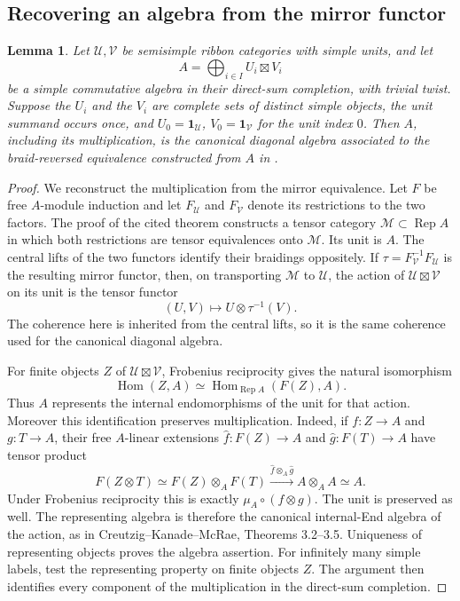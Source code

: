 \documentclass[11pt,a4paper]{article}
\numberwithin{equation}{section}
\newtheorem{lemma}[theorem]{Lemma}
\theoremstyle{definition}\newtheorem{definition}[theorem]{Definition}
\theoremstyle{remark}\newtheorem{remark}[theorem]{Remark}
\begin{document}
\subsection{Recovering an algebra from the mirror functor}

\begin{lemma}\label{c:mirror-recovers-algebra}
Let $\mathcal U,\mathcal V$ be semisimple ribbon categories with simple units,
and let
\[
 A=\bigoplus_{i\in I}U_i\boxtimes V_i
\]
be a simple commutative algebra in their direct-sum completion, with trivial
twist.  Suppose the $U_i$ and the $V_i$ are complete sets of distinct simple
objects, the unit summand occurs once, and $U_0=\mathbf1_{\mathcal U}$, $V_0=\mathbf1_{\mathcal V}$ for the unit index $0$.  Then $A$, including its multiplication, is the canonical diagonal
algebra associated to the braid-reversed equivalence constructed from $A$
in \cite[Proposition 4.4 and Theorem 4.5]{gluing}.
\end{lemma}
\begin{proof}
We reconstruct the multiplication from the mirror equivalence.  Let $F$ be free
$A$-module induction and let $F_{\mathcal U}$ and $F_{\mathcal V}$ denote its
restrictions to the two factors.  The proof of the cited theorem constructs
a tensor category $\mathcal M\subset\operatorname{Rep}A$ in which both
restrictions are tensor equivalences onto $\mathcal M$.  Its unit is $A$.
The central lifts of the two functors identify their braidings oppositely.
If $\tau=F_{\mathcal V}^{-1}F_{\mathcal U}$ is the resulting mirror functor,
then, on transporting $\mathcal M$ to $\mathcal U$, the action of
$\mathcal U\boxtimes\mathcal V$ on its unit is the tensor functor
\[
 (U,V)\longmapsto U\otimes\tau^{-1}(V).
\]
The coherence here is inherited from the central lifts, so it is the same
coherence used for the canonical diagonal algebra.

For finite objects $Z$ of $\mathcal U\boxtimes\mathcal V$, Frobenius
reciprocity gives the natural isomorphism
\[
 \operatorname{Hom}(Z,A)
   \simeq\operatorname{Hom}_{\operatorname{Rep}A}(F(Z),A).
\]
Thus $A$ represents the internal endomorphisms of the unit for that action.
Moreover this identification preserves multiplication.  Indeed, if
$f:Z\to A$ and $g:T\to A$, their free $A$-linear extensions
$\widehat f:F(Z)\to A$ and $\widehat g:F(T)\to A$ have tensor product
\[
 F(Z\otimes T)\simeq F(Z)\otimes_A F(T)
 \xrightarrow{\widehat f\otimes_A\widehat g}
 A\otimes_A A\simeq A.
\]
Under Frobenius reciprocity this is exactly $\mu_A\circ(f\otimes g)$.
The unit is preserved as well.  The representing algebra is therefore the
canonical internal-End algebra of the action, as in
Creutzig--Kanade--McRae, Theorems 3.2--3.5.  Uniqueness of representing
objects proves the algebra assertion.  For infinitely many simple labels, test the representing property on
finite objects $Z$. The argument then identifies every component of
the multiplication in the direct-sum completion.
\end{proof}
\end{document}
